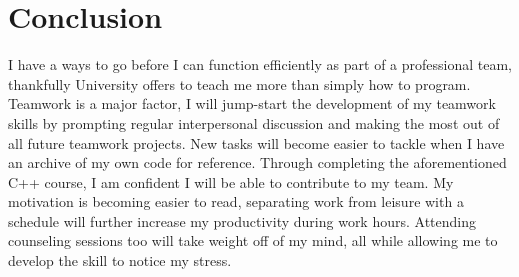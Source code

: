 \documentclass{article}
\begin{document}
\section{Conclusion}

I have a ways to go before I can function efficiently as part of a professional team, thankfully University offers to teach me more than simply how to program.
Teamwork is a major factor, I will jump-start the development of my teamwork skills by prompting regular interpersonal discussion and making the most out of all future teamwork projects.
New tasks will become easier to tackle when I have an archive of my own code for reference. Through completing the aforementioned C++ course, I am confident I will be able to contribute to my team.
My motivation is becoming easier to read, separating work from leisure with a schedule will further increase my productivity during work hours. Attending counseling sessions too will take weight off of my mind, all while allowing me to develop the skill to notice my stress.


 
\end{document}
